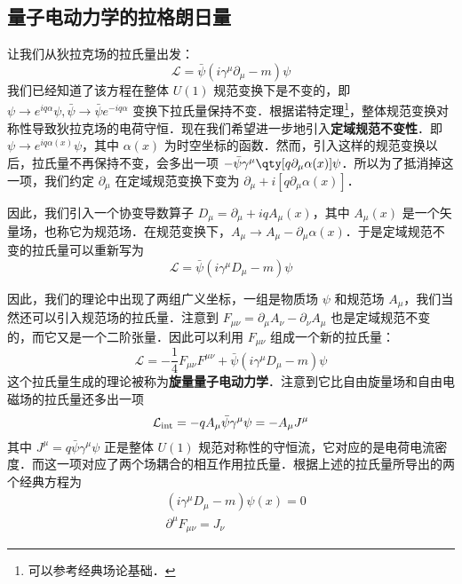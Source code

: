 

\subsection{量子电动力学的拉格朗日量}
让我们从狄拉克场的拉氏量出发：
\begin{equation}
\mathcal{L}=\bar\psi (i\gamma^\mu \partial_\mu - m)\psi 
\end{equation}
我们已经知道了该方程在整体 $U(1)$ 规范变换下是不变的，即 $\psi\rightarrow e^{iq\alpha}\psi,\bar\psi \rightarrow \bar\psi e^{-iq\alpha}$ 变换下拉氏量保持不变．根据诺特定理\footnote{可以参考经典场论基础．}，整体规范变换对称性导致狄拉克场的电荷守恒．现在我们希望进一步地引入\textbf{定域规范不变性}．即 $\psi\rightarrow e^{iq\alpha(x)}\psi $，其中 $\alpha(x)$ 为时空坐标的函数．然而，引入这样的规范变换以后，拉氏量不再保持不变，会多出一项 $-\bar\psi \gamma^\mu \qty[q\partial_\mu \alpha(x)]\psi$．所以为了抵消掉这一项，我们约定 $\partial_\mu$ 在定域规范变换下变为 $\partial_\mu+i[q\partial_\mu \alpha(x)]$．

因此，我们引入一个协变导数算子 $D_\mu = \partial_\mu +iqA_\mu(x)$，其中 $A_\mu(x)$ 是一个矢量场，也称它为规范场．在规范变换下，$A_\mu\rightarrow A_\mu - \partial_\mu \alpha(x)$．于是定域规范不变的拉氏量可以重新写为
\begin{equation}
\mathcal{L}=\bar\psi(i\gamma^\mu D_\mu-m)\psi 
\end{equation}

因此，我们的理论中出现了两组广义坐标，一组是物质场 $\psi$ 和规范场 $A_\mu$，我们当然还可以引入规范场的拉氏量．注意到 $F_{\mu\nu} = \partial_\mu A_\nu - \partial_\nu A_\mu$ 也是定域规范不变的，而它又是一个二阶张量．因此可以利用 $F_{\mu\nu}$ 组成一个新的拉氏量：
\begin{equation}
\mathcal{L}=-\frac{1}{4}F_{\mu\nu}F^{\mu\nu} + \bar\psi (i\gamma^\mu D_\mu - m)\psi
\end{equation}
这个拉氏量生成的理论被称为\textbf{旋量量子电动力学}．注意到它比自由旋量场和自由电磁场的拉氏量还多出一项
\begin{equation}
\mathcal{L}_{\rm int}=-q A_\mu \bar\psi \gamma^\mu \psi=-A_\mu J^\mu
\end{equation}
其中 $J^\mu = q\bar\psi \gamma^\mu \psi$ 正是整体 $U(1)$ 规范对称性的守恒流，它对应的是电荷电流密度．而这一项对应了两个场耦合的相互作用拉氏量．根据上述的拉氏量所导出的两个经典方程为
\begin{equation}
\begin{aligned}
&(i\gamma^\mu D_\mu - m)\psi(x)=0\\
&\partial^\mu F_{\mu\nu}=J_\nu
\end{aligned}
\end{equation}
